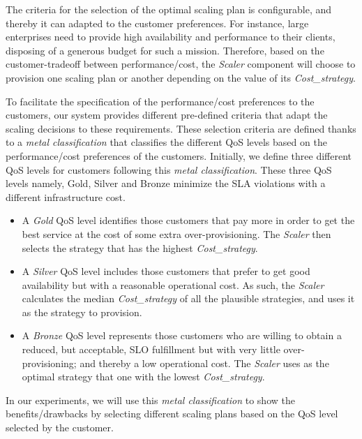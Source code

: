 
The criteria for the selection of the optimal scaling plan is configurable, and thereby it can adapted to the customer preferences. For instance, large enterprises need to provide high availability and performance to their clients, disposing of a generous budget for such a mission. Therefore, based on the customer-tradeoff between performance/cost, the \emph{Scaler} component will choose to provision one scaling plan or another depending on the value of its \emph{Cost\_strategy}. 

To facilitate the specification of the performance/cost preferences to the customers, our system provides different pre-defined criteria that adapt the scaling decisions to these requirements. These selection criteria are defined thanks to a \emph{metal classification} that classifies  the different QoS levels based on the performance/cost preferences of the customers. Initially, we define three different QoS levels for customers following this \emph{metal classification}. These three QoS levels namely, Gold, Silver and Bronze minimize the SLA violations with a different infrastructure cost. 

\begin{itemize}
\item A \emph{Gold} QoS level identifies those customers that pay more in order to get the best service at the cost of some extra over-provisioning. The \emph{Scaler} then selects the strategy that has the highest \emph{Cost\_strategy}.
\item A \emph{Silver} QoS level includes those customers that prefer to get good availability but with a reasonable operational cost. As such, the \emph{Scaler} calculates the median \emph{Cost\_strategy} of all the plausible strategies, and uses it as the strategy to provision.
\item A  \emph{Bronze} QoS level represents those customers who are willing to obtain a reduced, but acceptable, SLO fulfillment but with very little over-provisioning; and thereby a low operational cost. The \emph{Scaler} uses as the optimal strategy that one with the lowest \emph{Cost\_strategy}.

\end{itemize}

In our experiments, we will use this \emph{metal classification} to show the benefits/drawbacks by selecting different scaling plans based on the QoS level selected by the customer.

